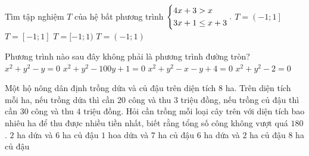 \begin{ex}%
	Tìm tập nghiệm $T$ của hệ bất phương trình $\left\{\begin{aligned}&4x+3>x\\& 3x+1 \leq x+3\end{aligned}\right..$
	\choice
	{ \True $ T= \left(-1; 1 \right]$}
	{$ T=[-1; 1]$}
	{$ T=[-1;1 )$}
	{$ T=(-1;1)$}
\end{ex}
\begin{ex}%
	Phương trình nào sau đây không phải là phương trình đường tròn?
	\choice
	{$x^2+y^2-y=0$}
	{$ x^2+y^2-100y+1=0$}
	{\True $x^2+y^2-x-y+4=0$}
	{$x^2+y^2-2=0$}
\end{ex}
\begin{ex}%
	Một hộ nông dân định trồng dứa và củ đậu trên diện tích $8$ ha. Trên diện tích mỗi ha, nếu trồng dứa thì cần $20$ công và thu $3$ triệu đồng, nếu trồng củ đậu thì cần $30$ công và thu $4$ triệu đồng. Hỏi cần trồng mỗi loại cây trên với diện tích bao nhiêu ha để thu được nhiều tiền nhất, biết rằng tổng số công không vượt quá $180$.
	\choice
	{\True $2$ ha dứa và $6$ ha củ đậu}
	{$1$ hoa dứa và $7$ ha củ đậu}
	{$6$ ha dứa và $2$ ha củ đậu}
	{$8$ ha củ đậu}
\end{ex}
